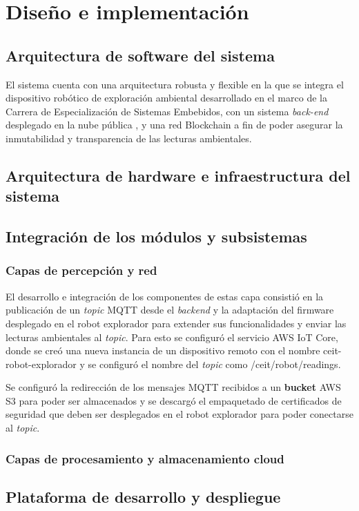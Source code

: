 \chapter{Diseño e implementación} %

\label{Chapter3} %




\section{Arquitectura de software del sistema}


El sistema cuenta con una arquitectura robusta y flexible en la que se integra el dispositivo robótico de exploración ambiental \citep{cese_gonzalo_memoria} desarrollado en el marco de la Carrera de Especialización de Sistemas Embebidos, con un sistema \textit{back-end} desplegado en la nube pública \citep{nube_publica}, y una red Blockchain \cite{blockchain} a fin de poder asegurar la inmutabilidad y transparencia de las lecturas ambientales. 


\section{Arquitectura de hardware e infraestructura del sistema}
 
 
\section{Integración de los módulos y subsistemas}

\subsection{Capas de percepción y red}

El desarrollo e integración de los componentes de estas capa consistió en la publicación de un \textit{topic} MQTT desde el \textit{backend} y la adaptación del firmware desplegado en el robot explorador para extender sus funcionalidades y enviar las lecturas ambientales al \textit{topic}. Para esto se configuró el servicio AWS IoT Core, donde se creó una nueva instancia de un dispositivo remoto con el nombre ceit-robot-explorador y se configuró el nombre del \textit{topic} como /ceit/robot/readings.

Se configuró la redirección de los mensajes MQTT recibidos a un \textbf{bucket} AWS S3 para poder ser almacenados y se descargó el empaquetado de certificados de seguridad que deben ser desplegados en el robot explorador para poder conectarse al \textit{topic}.

\subsection{Capas de procesamiento y almacenamiento cloud}



\section{Plataforma de desarrollo y despliegue}




